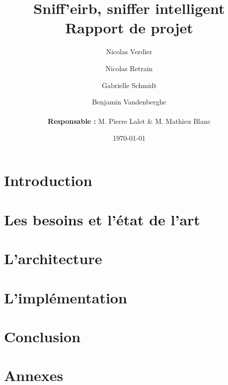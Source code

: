 \documentclass[a4]{report}
\begin{document}
		
	\title{\Large{\textbf{Sniff'eirb, sniffer intelligent}}\\\Huge{\textbf{Rapport de projet}}}
	\author{
	Nicolas Verdier \and Nicolas Retrain \and Gabrielle Schmidt \and Benjamin Vandenberghe \\
	\\
	\textbf{Responsable : } M. Pierre Lalet \& M. Mathieu Blanc}
	\date{\today}
	
	\maketitle

	\tableofcontents{}
	\newpage
	
	\chapter*{Introduction}
		

	

		
	\chapter{Les besoins et l'état de l'art}
		
			
	\chapter{L'architecture}
		
		
	\chapter{L'implémentation}
		
	
						
	\chapter*{Conclusion}
		
	
	\chapter*{Annexes}
		
	
\end{document}
